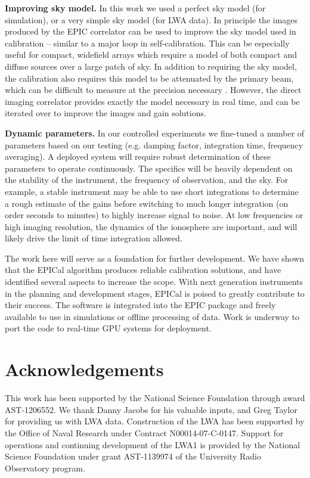 \documentclass[a4paper,fleqn,usenatbib]{../mnras}
\begin{document}
\textbf{Improving sky model.} In this work we used a perfect sky model (for simulation), or a very simple sky model (for LWA data). In principle the images produced by the EPIC correlator can be used to improve the sky model used in calibration -- similar to a major loop in self-calibration. This can be especially useful for compact, widefield arrays which require a model of both compact and diffuse sources over a large patch of sky. In addition to requiring the sky model, the calibration also requires this model to be attenuated by the primary beam, which can be difficult to measure at the precision necessary \citep[e.g.][]{neb15,vir14,thy15b}. However, the direct imaging correlator provides exactly the model necessary in real time, and can be iterated over to improve the images and gain solutions.

\textbf{Dynamic parameters.} In our controlled experiments we fine-tuned a number of parameters based on our testing (e.g. damping factor, integration time, frequency averaging). A deployed system will require robust determination of these parameters to operate continuously. The specifics will be heavily dependent on the stability of the instrument, the frequency of observation, and the sky. For example, a stable instrument may be able to use short integrations to determine a rough estimate of the gains before switching to much longer integration (on order seconds to minutes) to highly increase signal to noise. At low frequencies or high imaging resolution, the dynamics of the ionosphere are important, and will likely drive the limit of time integration allowed.

The work here will serve as a foundation for further development. We have shown that the EPICal algorithm produces reliable calibration solutions, and have identified several aspects to increase the scope. With next generation instruments in the planning and development stages, EPICal is poised to greatly contribute to their success. The software is integrated into the EPIC package and freely available to use in simulations or offline processing of data. Work is underway to port the code to real-time GPU systems for deployment. 

\section*{Acknowledgements}
This work has been supported by the National Science Foundation through award AST-1206552. 
We thank Danny Jacobs for his valuable inputs, and Greg Taylor for providing us with LWA data. 
Construction of the LWA has been supported by the Office of Naval Research under 
Contract N00014-07-C-0147. Support for operations and continuing development of 
the LWA1 is provided by the National Science Foundation under grant AST-1139974 
of the University Radio Observatory program.
\end{document}
